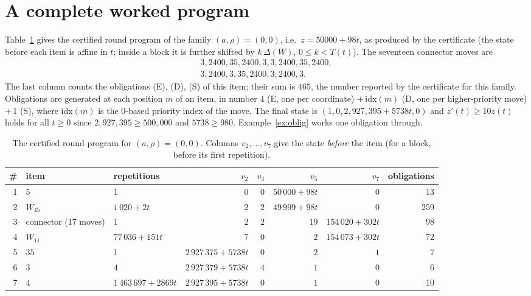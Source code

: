 \documentclass[11pt,a4paper]{article}
\theoremstyle{definition}
\begin{document}
\section{A complete worked program}\label{app:worked}
Table~\ref{tab:worked} gives the certified round program of the family $(a,\rho)=(0,0)$, i.e.\ $z=50000+98t$, as produced by the certificate (the state before each item is affine in $t$; inside a block it is further shifted by $k\,\Delta(W)$, $0\le k<T(t)$). The seventeen connector moves are
\[\begin{gathered}3,2400,35,2400,3,3,2400,35,2400,\\3,2400,3,35,2400,3,2400,3.\end{gathered}\]
 The last column counts the obligations (E), (D), (S) of this item; their sum is $465$, the number reported by the certificate for this family. Obligations are generated at each position $m$ of an item, in number $4$ (E, one per coordinate) $+\,\mathrm{idx}(m)$ (D, one per higher-priority move) $+\,1$ (S), where $\mathrm{idx}(m)$ is the $0$-based priority index of the move. The final state is $(1,0,2{,}927{,}395+5738t,0)$ and $z'(t)\ge10z(t)$ holds for all $t\ge0$ since $2{,}927{,}395\ge500{,}000$ and $5738\ge980$. Example~\ref{ex:oblig} works one obligation through.

\begin{table}[h]
\centering\small
\footnotesize\setlength{\tabcolsep}{3pt}
\begin{tabular}{@{}rllrrrrr@{}}
\toprule
\# & item & repetitions & $v_2$ & $v_3$ & $v_5$ & $v_7$ & obligations\\
\midrule
1 & $5$ & 1 & $0$ & $0$ & $50\,000+98t$ & $0$ & 13 \\
2 & $W_{45}$ & $1\,020+2t$ & $2$ & $2$ & $49\,999+98t$ & $0$ & 259 \\
3 & connector (17 moves) & 1 & $2$ & $2$ & $19$ & $154\,020+302t$ & 98 \\
4 & $W_{11}$ & $77\,036+151t$ & $7$ & $0$ & $2$ & $154\,073+302t$ & 72 \\
5 & $35$ & 1 & $2\,927\,375+5738t$ & $0$ & $2$ & $1$ & 7 \\
6 & $3$ & $4$ & $2\,927\,379+5738t$ & $4$ & $1$ & $0$ & 6 \\
7 & $4$ & $1\,463\,697+2869t$ & $2\,927\,395+5738t$ & $0$ & $1$ & $0$ & 10 \\
\bottomrule
\end{tabular}
\caption{The certified round program for $(a,\rho)=(0,0)$. Columns $v_2,\dots,v_7$ give the state \emph{before} the item (for a block, before its first repetition).}
\label{tab:worked}
\end{table}
\end{document}

